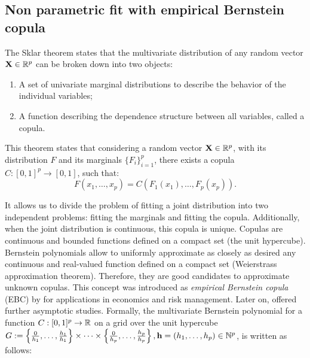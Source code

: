 \subsection{Non parametric fit with empirical Bernstein copula}\label{sec:ebc}
The  Sklar theorem \citep{joe_1997} states that the multivariate distribution of any random vector $\mathbf{X} \in \mathbb{R}^p$ can be broken down into two objects:
\begin{enumerate}
    \item A set of univariate marginal distributions to describe the behavior of the individual variables;
    \item A function describing the dependence structure between all variables, called a copula.
\end{enumerate}
This theorem states that considering a random vector $\mathbf{X} \in \mathbb{R}^p$, with its distribution $F$ and its marginals $\{F_i\}_{i=1}^p$, there exists a copula $C: [0, 1]^p \rightarrow [0, 1]$, such that:
\begin{equation}
    F(x_1, \dots, x_p) = C\left(F_1(x_1), \dots, F_p(x_p)\right). 
\end{equation}

It allows us to divide the problem of fitting a joint distribution into two independent problems: fitting the marginals and fitting the copula. 
Additionally, when the joint distribution is continuous, this copula is unique. 
Copulas are continuous and bounded functions defined on a compact set (the unit hypercube). 
Bernstein polynomials allow to uniformly approximate as closely as desired any continuous and real-valued function defined on a compact set (Weierstrass approximation theorem). 
Therefore, they are good candidates to approximate unknown copulas. 
This concept was introduced as \textit{empirical Bernstein copula} (EBC) by \cite{sancetta_satchell_2004} for applications in economics and risk management. 
Later on, \cite{segers_2017} offered further asymptotic studies. Formally, the multivariate Bernstein polynomial for a function $C: [0, 1]^p \rightarrow \mathbb{R}$ on a grid over the unit hypercube $G:=\left\{\frac{0}{h_1}, \dots, \frac{h_1}{h_1}\right\} \times \dots \times \left\{\frac{0}{h_p}, \dots, \frac{h_p}{h_p}\right\}, \mathbf{h} = (h_1, \dots, h_p) \in \mathbb{N}^p$, is written as follows: 

